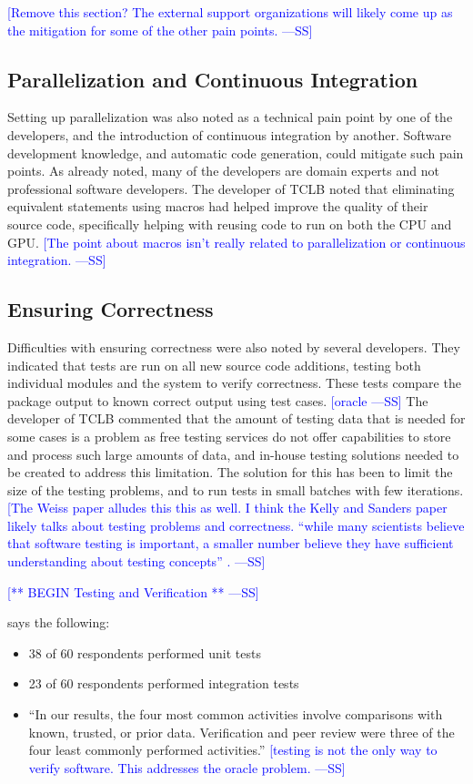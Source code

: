 \documentclass[final, 3p, times, authoryear]{elsarticle}
\newcommand{\authornote}[3]{\textcolor{#1}{[#3 ---#2]}}
\newcommand{\authornote}[3]{}
\newcommand{\wss}[1]{\authornote{blue}{SS}{#1}} %
\begin{document}
\wss{Remove this section?  The external support organizations will likely come
up as the mitigation for some of the other pain points.}

\subsection{Parallelization and Continuous Integration}

Setting up parallelization was also noted as a technical pain point by one of
the developers, and the introduction of continuous integration by another.
Software development knowledge, and automatic code generation, could mitigate
such pain points. As already noted, many of the developers are domain experts
and not professional software developers. The developer of TCLB noted that
eliminating equivalent statements using macros had helped improve the quality of
their source code, specifically helping with reusing code to run on both the CPU
and GPU. \wss{The point about macros isn't really related to parallelization or
continuous integration.}

\subsection{Ensuring Correctness}

Difficulties with ensuring correctness were also noted by several developers.
They indicated that tests are run on all new source code additions, testing both
individual modules and the system to verify correctness. These tests compare the
package output to known correct output using test cases. \wss{oracle}  The
developer of TCLB commented that the amount of testing data that is needed for
some cases is a problem as free testing services do not offer capabilities to
store and process such large amounts of data, and in-house testing solutions
needed to be created to address this limitation. The solution for this has been
to limit the size of the testing problems, and to run tests in small batches
with few iterations. \wss{The Weiss paper alludes this this as well.  I think
the Kelly and Sanders paper likely talks about testing problems and correctness.
``while many scientists believe that software testing is important, a smaller
number believe they have sufficient understanding about testing concepts''
\citep{HannayEtAl2009}.}

\wss{** BEGIN Testing and Verification **}

\citet{Nguyen-HoanEtAl2010} says the following:
\begin{itemize}
	\item 38 of 60 respondents performed unit tests
	\item 23 of 60 respondents performed integration tests
	\item ``In our results, the four most common activities involve comparisons
	with known, trusted, or prior data. Verification and peer review were three
	of the four least commonly performed activities.'' \wss{testing is not the
	only way to verify software.  This addresses the oracle problem.}
\end{itemize}
\end{document}
